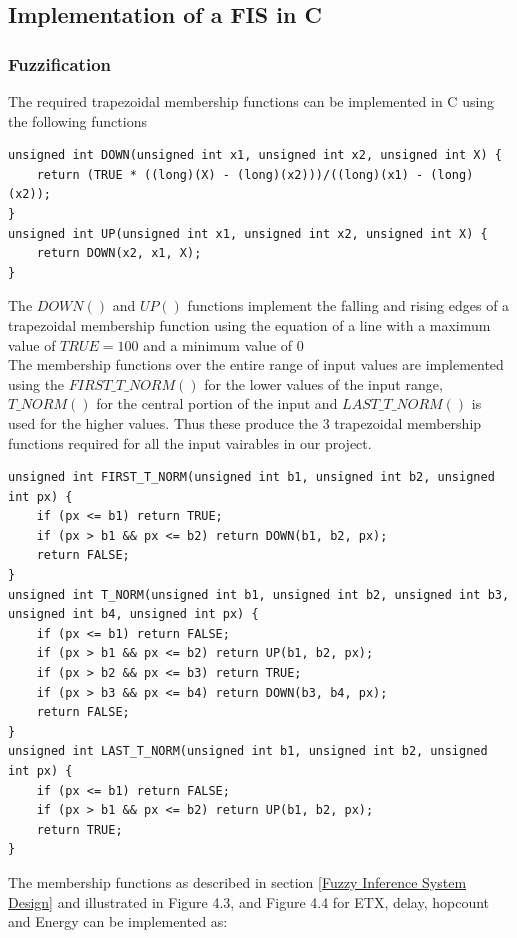 \subsection{Implementation of a FIS in C} \label{Implementation of a FIS in C}
\subsubsection{Fuzzification} \label{Fuzzification}
The required trapezoidal membership functions can be implemented in C using the following functions
\begin{verbatim}
unsigned int DOWN(unsigned int x1, unsigned int x2, unsigned int X) {
	return (TRUE * ((long)(X) - (long)(x2)))/((long)(x1) - (long)(x2));
}
unsigned int UP(unsigned int x1, unsigned int x2, unsigned int X) {
	return DOWN(x2, x1, X);
}
\end{verbatim}
The $DOWN()$ and $UP()$ functions implement the falling and rising edges of a trapezoidal membership function using the equation of a line with a maximum value of $TRUE=100$ and a minimum value of $0$\\
The membership functions over the entire range of input values are implemented using the $FIRST\_T\_NORM()$ for the lower values of the input range, $T\_NORM()$ for the central portion of the input and $LAST\_T\_NORM()$ is used for the higher values. Thus these produce the 3 trapezoidal membership functions required for all the input vairables in our project.
\begin{verbatim}
unsigned int FIRST_T_NORM(unsigned int b1, unsigned int b2, unsigned int px) {
	if (px <= b1) return TRUE;
	if (px > b1 && px <= b2) return DOWN(b1, b2, px);
	return FALSE;
}
unsigned int T_NORM(unsigned int b1, unsigned int b2, unsigned int b3, unsigned int b4, unsigned int px) {
	if (px <= b1) return FALSE;
	if (px > b1 && px <= b2) return UP(b1, b2, px);
	if (px > b2 && px <= b3) return TRUE;
	if (px > b3 && px <= b4) return DOWN(b3, b4, px);
	return FALSE;
}
unsigned int LAST_T_NORM(unsigned int b1, unsigned int b2, unsigned int px) {
	if (px <= b1) return FALSE;
	if (px > b1 && px <= b2) return UP(b1, b2, px);
	return TRUE;
}
\end{verbatim}
The membership functions as described in section \ref{Fuzzy Inference System Design} and illustrated in Figure 4.3, and Figure 4.4 for ETX, delay, hopcount and Energy can be implemented as:
